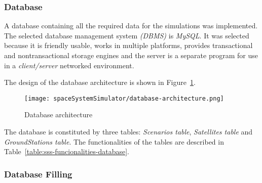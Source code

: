 \subsubsection{Database}

A database containing all the required data for the simulations was
implemented. The selected database management system \emph{(DBMS)} is
\emph{MySQL}. It was selected because it is friendly usable, works in multiple
platforms, provides transactional and nontransactional storage engines and the server is a separate program for use in a \emph{client/server} networked environment.

The design of the database architecture is shown in Figure~\ref{fig:sss-database-architecture}.

\begin{figure}[!h]
\begin{center}
\texttt{[image: spaceSystemSimulator/database-architecture.png]}
\caption{Database architecture}
\label{fig:sss-database-architecture}
\end{center}
\end{figure}

The database is constituted by three tables: \emph{Scenarios table},
\emph{Satellites table} and \emph{GroundStations table}. The functionalities of the tables are described in
Table~\ref{table:sss-funcionalities-database}.

%   
 

\subsubsection{Database Filling}

